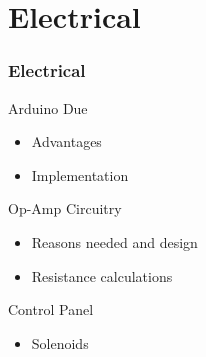 \documentclass{beamer}
\begin{document}
\section{Electrical}
\begin{frame}
	\frametitle{Electrical}
		\begin{block}{Arduino Due}
			\begin{itemize}
				\item Advantages
				\item Implementation
			\end{itemize}
		\end{block}
		\begin{block}{Op-Amp Circuitry}
			\begin{itemize}
				\item Reasons needed and design
				\item Resistance calculations
			\end{itemize}
		\end{block}
		\begin{block}{Control Panel}
			\begin{itemize}
				\item Solenoids
			\end{itemize}
		\end{block}		
\end{frame}	
\end{document}
